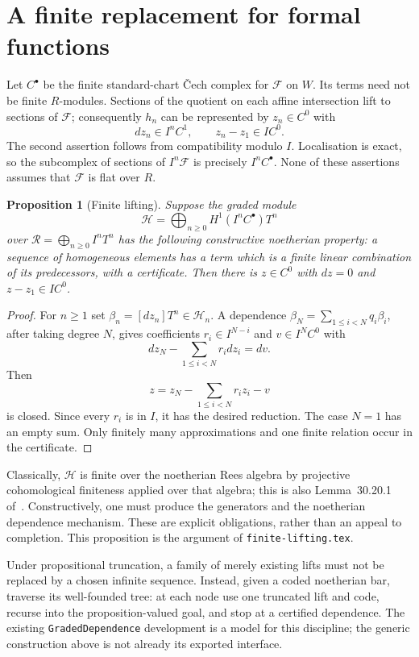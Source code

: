 \documentclass[11pt]{amsart}
\newtheorem{proposition}[theorem]{Proposition}
\theoremstyle{definition}
\theoremstyle{remark}
\newcommand{\FF}{\mathcal F}
\newcommand{\code}[1]{\texttt{#1}}
\begin{document}
\section{A finite replacement for formal functions}

Let $C^\bullet$ be the finite standard-chart \v Cech complex for $\FF$
on $W$. Its terms need not be finite $R$-modules. Sections of the
quotient on each affine intersection lift to sections of $\FF$;
consequently $h_n$ can be represented by $z_n\in C^0$ with
\[
 dz_n\in I^nC^1,\qquad z_n-z_1\in IC^0.
\]
The second assertion follows from compatibility modulo $I$.
Localisation is exact, so the subcomplex of sections of $I^n\FF$
is precisely $I^nC^\bullet$. None of these assertions assumes that
$\FF$ is flat over $R$.

\begin{proposition}[Finite lifting]\label{prop:finite}
Suppose the graded module
\[
 \mathcal H=\bigoplus_{n\geq0}H^1(I^nC^\bullet)T^n
\]
over $\mathcal R=\bigoplus_{n\geq0}I^nT^n$ has the following
constructive noetherian property: a sequence of homogeneous elements
has a term which is a finite linear combination of its predecessors,
with a certificate. Then there is $z\in C^0$ with
$dz=0$ and $z-z_1\in IC^0$.
\end{proposition}
\begin{proof}
For $n\geq1$ set $\beta_n=[dz_n]T^n\in\mathcal H_n$.
A dependence $\beta_N=\sum_{1\leq i<N}q_i\beta_i$, after taking
degree $N$, gives coefficients $r_i\in I^{N-i}$ and
$v\in I^NC^0$ with
\[
 dz_N-\sum_{1\leq i<N}r_i dz_i=dv.
\]
Then
\[
 z=z_N-\sum_{1\leq i<N}r_i z_i-v
\]
is closed. Since every $r_i$ is in $I$, it has the desired reduction.
The case $N=1$ has an empty sum. Only finitely many approximations
and one finite relation occur in the certificate.
\end{proof}

Classically, $\mathcal H$ is finite over the noetherian Rees algebra
by projective cohomological finiteness applied over that algebra;
this is also Lemma~30.20.1 of~\cite{Stacks}. Constructively, one must
produce the generators and the noetherian dependence mechanism.
These are explicit obligations, rather than an appeal to completion.
This proposition is the argument of \code{finite-lifting.tex}.

Under propositional truncation, a family of merely existing lifts
must not be replaced by a chosen infinite sequence. Instead, given
a coded noetherian bar, traverse its well-founded tree: at each node
use one truncated lift and code, recurse into the proposition-valued
goal, and stop at a certified dependence. The existing
\code{GradedDependence} development is a model for this discipline;
the generic construction above is not already its exported interface.
\end{document}
